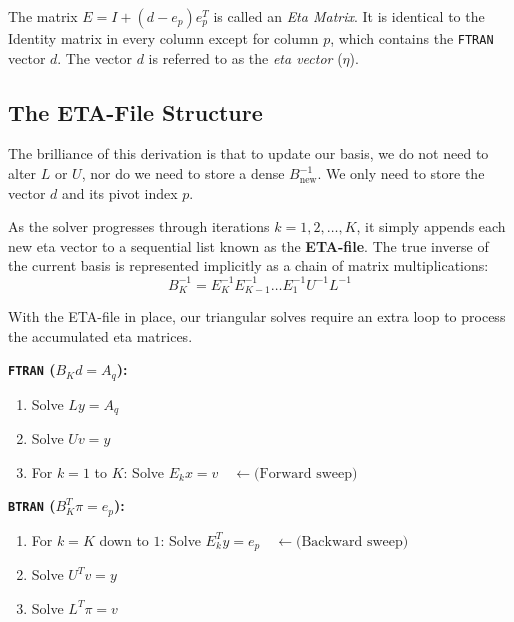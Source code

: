 \documentclass[11pt, a4paper]{article}
\begin{document}
\begin{definition}
The matrix $E = I + (d - e_p) e_p^T$ is called an \emph{Eta Matrix}. It is identical to the Identity matrix in every column except for column $p$, which contains the \texttt{FTRAN} vector $d$. The vector $d$ is referred to as the \emph{eta vector} ($\eta$).
\end{definition}

\subsection{The ETA-File Structure}

The brilliance of this derivation is that to update our basis, we do not need to alter $L$ or $U$, nor do we need to store a dense $B_{\text{new}}^{-1}$. We only need to store the vector $d$ and its pivot index $p$.

As the solver progresses through iterations $k = 1, 2, \dots, K$, it simply appends each new eta vector to a sequential list known as the \textbf{ETA-file}. The true inverse of the current basis is represented implicitly as a chain of matrix multiplications:
\[
B_K^{-1} = E_K^{-1} E_{K-1}^{-1} \dots E_1^{-1} U^{-1} L^{-1}
\]

\begin{algostep}
With the ETA-file in place, our triangular solves require an extra loop to process the accumulated eta matrices.

\textbf{\texttt{FTRAN} ($B_K d = A_q$):}
\begin{enumerate}[label=\textbf{\arabic*.}, leftmargin=*, itemsep=2pt]
    \item Solve $L y = A_q$
    \item Solve $U v = y$
    \item For $k = 1$ to $K$: Solve $E_k x = v \quad \leftarrow \text{(Forward sweep)}$
\end{enumerate}

\textbf{\texttt{BTRAN} ($B_K^T \pi = e_p$):}
\begin{enumerate}[label=\textbf{\arabic*.}, leftmargin=*, itemsep=2pt]
    \item For $k = K$ down to $1$: Solve $E_k^T y = e_p \quad \leftarrow \text{(Backward sweep)}$
    \item Solve $U^T v = y$
    \item Solve $L^T \pi = v$
\end{enumerate}
\end{algostep}
\end{document}
